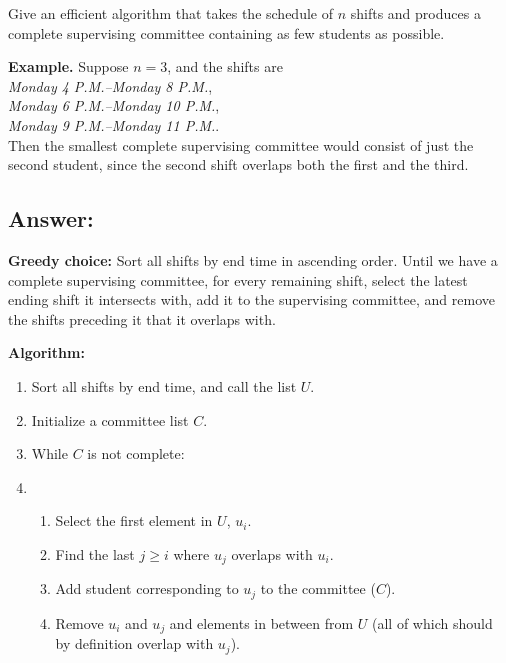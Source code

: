 \documentclass[12pt, letterpaper]{article}
\begin{document}
Give an efficient algorithm that takes the schedule of $n$ shifts and produces a complete supervising committee containing as few students as possible.

\vspace{5mm}

\noindent\textbf{Example.} Suppose $n = 3$, and the shifts are\\
\indent \textit{Monday 4 P.M.–Monday 8 P.M.}, \\
\indent \textit{Monday 6 P.M.–Monday 10 P.M.}, \\
\indent \textit{Monday 9 P.M.–Monday 11 P.M.}.\\

Then the smallest complete supervising committee would consist of just the second student, since the second shift overlaps both the first and the third.

\clearpage
\subsection*{Answer:}
\noindent \textbf{Greedy choice:}
Sort all shifts by end time in ascending order.
Until we have a complete supervising committee, for every remaining shift, select the latest ending shift it intersects with, add it to the supervising committee, and remove the shifts preceding it that it overlaps with.


\vspace{7.5mm}
\noindent\textbf{Algorithm:} 
\begin{enumerate}
    \item Sort all shifts by end time, and call the list $U$.
    \item Initialize a committee list $C$.
    \item While $C$ is not complete:
    \item \begin{enumerate}
        \item Select the first element in $U$, $u_i$.
        \item Find the last $j \geq i$ where $u_j$ overlaps with $u_i$.
        \item Add student corresponding to $u_j$ to the committee ($C$).
        \item Remove $u_i$ and $u_j$ and elements in between from $U$ (all of which should by definition overlap with $u_j$).
    \end{enumerate}
\end{enumerate}
\end{document}
